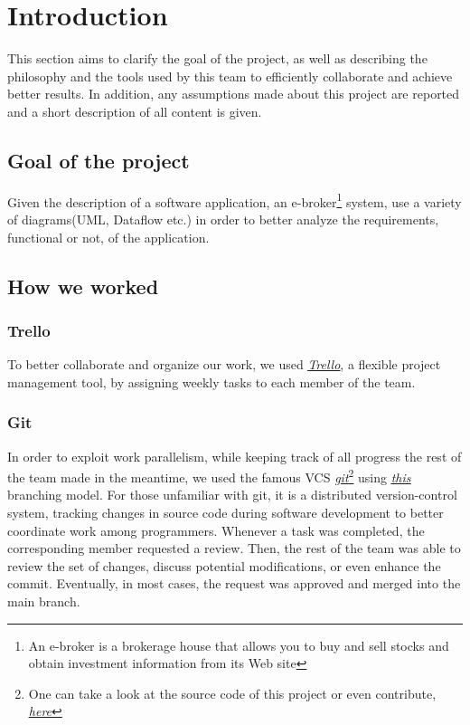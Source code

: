 \documentclass{article}
\begin{document}
\tableofcontents
\newpage
\section{Introduction}
This section aims to clarify the goal of the project, as well as describing the philosophy and the tools used by this team to efficiently collaborate and achieve better results. In addition, any assumptions made about this project are reported and a short description of all content is given.
\subsection{Goal of the project}
Given the description of a software application, an e-broker\footnote{An e-broker is a brokerage house that allows you to buy and sell stocks and obtain investment information from its Web site} system, use a variety of diagrams(UML, Dataflow etc.) in order to better analyze the requirements, functional or not, of the application. 
\subsection{How we worked}

\subsubsection{Trello}
To better collaborate and organize our work, we used \href{https://trello.com}{\underline{\textit{Trello}}}, a flexible project management tool, by assigning weekly tasks to each member of the team.

\subsubsection{Git}
In order to exploit work parallelism, while keeping track of all progress the rest of the team made in the meantime, we used the famous VCS \href{https://github.com/}{\underline{\emph{git}}}\footnote{One can take a look at the source code of this project or even contribute, \href{https://github.com/KostasKoyias/Software_Analysis}{\underline{\textit{here}}}} using \href{https://nvie.com/files/Git-branching-model.pdf}{\underline{\emph{this}}} branching model. For those unfamiliar with git, it is a distributed version-control system, tracking changes in source code during software development to better coordinate work among programmers. Whenever a task was completed, the corresponding member requested a review. Then, the rest of the team was able to review the set of changes, discuss potential modifications, or even enhance the commit. Eventually, in most cases, the request was approved and merged into the main branch.
\end{document}
